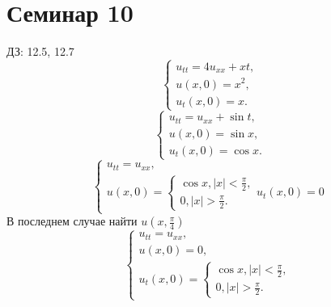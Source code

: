 \documentclass[11pt]{article}
\def\zall{\setcounter{lem}{0}\setcounter{cnsqnc}{0}\setcounter{th}{0}\setcounter{Cmt}{0}\setcounter{equation}{0}}
\newcounter{lem}\setcounter{lem}{0}
\newcounter{th}\setcounter{th}{0}
\newcounter{cnsqnc}\setcounter{cnsqnc}{0}
\newcounter{Cmt}\setcounter{Cmt}{0}
\begin{document}
\section{Семинар 10}
\label{sec:org9ad4825}
\zall
ДЗ: 12.5, 12.7
\begin{equation}
\begin{cases}
u_{tt} = 4u_{xx} + xt, \\
u(x, 0) = x^2, \\
u_t(x, 0) = x.
\end{cases}
\end{equation}
\begin{equation}
\begin{cases}
u_{tt} = u_{xx} + \sin t, \\
u(x, 0) = \sin x, \\
u_t(x, 0) = \cos x.
\end{cases}
\end{equation}
\begin{equation}
\begin{cases}
u_{tt} = u_{xx}, \\
u(x, 0) = \begin{cases}
\cos x, |x| < \frac{\pi}2, \\
0, |x| > \frac{\pi}2.
\end{cases}
u_t(x, 0) = 0
\end{cases}
\end{equation}
В последнем случае найти $u\left(x, \frac{\pi}4\right)$
\begin{equation}
\begin{cases}
u_{tt} = u_{xx}, \\
u(x, 0) = 0, \\
u_t(x, 0) = \begin{cases}
\cos x, |x| < \frac{\pi}2, \\
0, |x| > \frac{\pi}2.
\end{cases}
\end{cases}
\end{equation}
\end{document}
